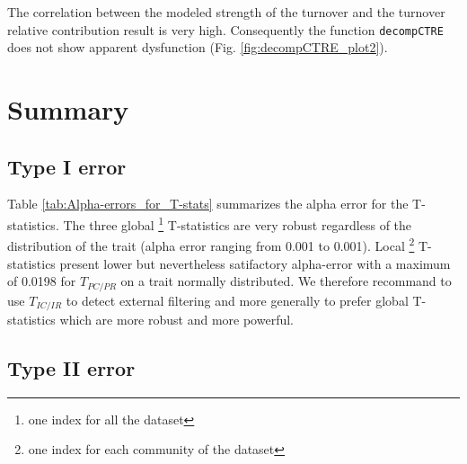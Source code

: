 \documentclass[12pt]{article}\usepackage[]{graphicx}\usepackage[]{color}
\begin{document}
The correlation between the modeled strength of the turnover and the turnover relative contribution result is very high. Consequently the function \texttt{decompCTRE} does not show apparent dysfunction (Fig. \ref{fig:decompCTRE_plot2}).

\cleardoublepage


\section{Summary}
\label{sect:summary}

\subsection{Type I error}

Table \ref{tab:Alpha-errors_for_T-stats} summarizes the alpha error for the T-statistics. The three global \footnote{one index for all the dataset} T-statistics are very robust 
regardless of the distribution of the trait (alpha error ranging from 0.001 to 0.001). Local \footnote{one index for each community of the dataset} T-statistics present lower but nevertheless satifactory alpha-error with a maximum of 0.0198 for $T_{PC/PR}$ on a trait normally distributed. We therefore recommand to use $T_{IC/IR}$ to detect external filtering and more generally to prefer global T-statistics which are more robust and more powerful.


\subsection{Type II error}
\end{document}

